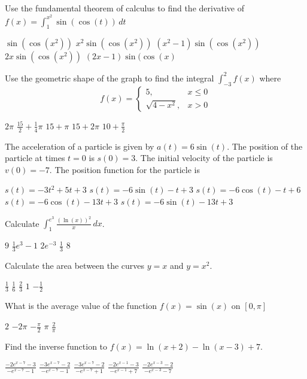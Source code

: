 \documentclass[11pt]{article}
\begin{document}
\begin{questions}
\begin{multiplechoice}{5}
\newpage

\question Use the fundamental theorem of calculus to find the derivative of 
$\displaystyle f(x) = \int_1^{x^2} \sin(\cos(t)) \, dt$
\begin{answers}{2}
\ans $\sin(\cos(x^2))$
\ans $x^2 \sin(\cos(x^2))$
\ans $(x^2 - 1) \sin(\cos(x^2))$
\ans $2x \sin(\cos(x^2))$
\ans $(2x - 1) \sin(\cos(x)$
\end{answers}

\question Use the geometric shape of the graph to find the integral 
$\displaystyle \int_{-3}^2 f(x)$ where 
$$ f(x) = 
\begin{cases}
5, & x \le 0 \\
\sqrt{4 - x^2}, & x > 0
\end{cases}
$$
\begin{answers}{2}
\ans $2\pi$
\ans $\frac{15}{2} + \frac{1}{4}\pi$
\ans $15 + \pi$
\ans $15 + 2\pi$
\ans $10  + \frac{\pi}{2}$
\end{answers}

\question The acceleration of a particle is given by $a(t) = 6\sin(t)$.  The position
of the particle at times $t = 0$ is $s(0) = 3$.  The initial velocity of the particle is $v(0) = -7$.
The position function for the particle is
\begin{answers}{2}
\ans $s(t) = -3t^2 + 5t + 3$ 
\ans $s(t) = -6 \sin(t) -t + 3$
\ans $s(t) = -6 \cos(t) -t + 6$
\ans $s(t) = -6 \cos(t) - 13t + 3$
\ans $s(t) = -6 \sin(t) - 13t + 3$
\end{answers}

\question Calculate $\int_1^{e^3} \frac{(\ln(x))^2}{x} \, dx$.
\begin{answers}{2}
\ans $9$ 
\ans $\frac{1}{3} e^{3} - 1$
\ans $2e^{-3}$
\ans $\frac{1}{3}$
\ans $8$
\end{answers}

\question Calculate the area between the curves $y = x$ and $y = x^2$.
\begin{answers}{3}
\ans $\frac 1 3$ 
\ans $\frac 1 6$ 
\ans $\frac 2 3$ 
\ans $1$ 
\ans $- \frac 1 2$ 
\end{answers}

\question What is the average value of the function $f(x) = \sin(x)$ on $[0, \pi]$
\begin{answers}{3}
\ans $2$
\ans $-2\pi$
\ans $-\frac{\pi}{2}$
\ans $\pi$
\ans $\frac{2}{\pi}$
\end{answers}


\question Find the inverse function to $f(x) = \ln(x+2) - \ln(x-3) + 7$.
\begin{answers}{2}
\ans $\frac{-2e^{x-7} - 3}{-e^{x-7} - 1}$
\ans $\frac{-3e^{x-7} - 2}{-e^{x-7} - 1}$
\ans $\frac{-3e^{x-7} - 2}{-e^{x-7} + 1}$
\ans $\frac{-2e^{x-1} - 3}{-e^{x-1} + 7}$
\ans $\frac{-2e^{x-3} - 2}{-e^{x-3} - 7}$
\end{answers}

\end{multiplechoice}
\end{questions}
\end{document}
